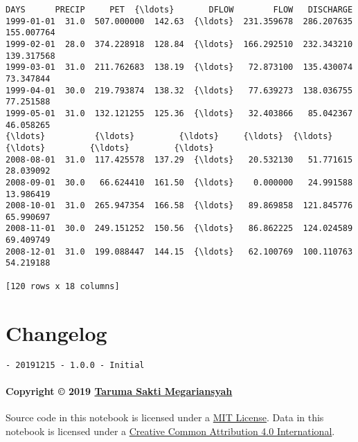 \documentclass[11pt]{article}
\makeatletter
\newcommand{\boxspacing}{\kern\kvtcb@left@rule\kern\kvtcb@boxsep}
\newcommand{\prompt}[4]{
        \ttfamily\llap{{\color{#2}[#3]:\hspace{3pt}#4}}\vspace{-\baselineskip}
    }
\makeatother
\begin{document}
            \begin{tcolorbox}[breakable, size=fbox, boxrule=.5pt, pad at break*=1mm, opacityfill=0]
\prompt{Out}{outcolor}{14}{\boxspacing}
\begin{Verbatim}[commandchars=\\\{\}]
            DAYS      PRECIP     PET  {\ldots}       DFLOW        FLOW   DISCHARGE
1999-01-01  31.0  507.000000  142.63  {\ldots}  231.359678  286.207635  155.007764
1999-02-01  28.0  374.228918  128.84  {\ldots}  166.292510  232.343210  139.317568
1999-03-01  31.0  211.762683  138.19  {\ldots}   72.873100  135.430074   73.347844
1999-04-01  30.0  219.793874  138.32  {\ldots}   77.639273  138.036755   77.251588
1999-05-01  31.0  132.121255  125.36  {\ldots}   32.403866   85.042367   46.058265
{\ldots}          {\ldots}         {\ldots}     {\ldots}  {\ldots}         {\ldots}         {\ldots}         {\ldots}
2008-08-01  31.0  117.425578  137.29  {\ldots}   20.532130   51.771615   28.039092
2008-09-01  30.0   66.624410  161.50  {\ldots}    0.000000   24.991588   13.986419
2008-10-01  31.0  265.947354  166.58  {\ldots}   89.869858  121.845776   65.990697
2008-11-01  30.0  249.151252  150.56  {\ldots}   86.862225  124.024589   69.409749
2008-12-01  31.0  199.088447  144.15  {\ldots}   62.100769  100.110763   54.219188

[120 rows x 18 columns]
\end{Verbatim}
\end{tcolorbox}
        
    \hypertarget{changelog}{%
\section{Changelog}\label{changelog}}

\begin{verbatim}
- 20191215 - 1.0.0 - Initial
\end{verbatim}

\hypertarget{copyright-2019-taruma-sakti-megariansyah}{%
\paragraph{\texorpdfstring{Copyright © 2019
\href{https://taruma.github.io}{Taruma Sakti
Megariansyah}}{Copyright © 2019 Taruma Sakti Megariansyah}}\label{copyright-2019-taruma-sakti-megariansyah}}

Source code in this notebook is licensed under a
\href{https://choosealicense.com/licenses/mit/}{MIT License}. Data in
this notebook is licensed under a
\href{https://creativecommons.org/licenses/by/4.0/}{Creative Common
Attribution 4.0 International}.


    
    
    
\end{document}
